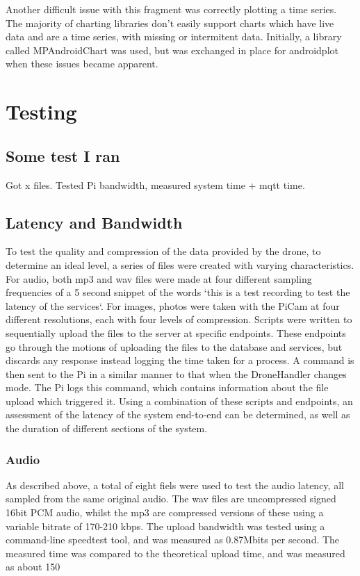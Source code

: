 \documentclass{article}
\begin{document}
Another difficult issue with this fragment was correctly plotting a time series. The majority of charting libraries don't easily support charts which have live data and are a time series, with missing or intermitent data. Initially, a library called MPAndroidChart was used, but was exchanged in place for androidplot when these issues became apparent.   

\section{Testing} \label{Testing}

\subsection{Some test I ran}
Got  x files. Tested Pi bandwidth, measured system time + mqtt time. 

\subsection{Latency and Bandwidth}

To test the quality and compression of the data provided by the drone, to determine an ideal level, a series of files were created with varying characteristics. For audio, both mp3 and wav files were made at four different sampling frequencies of a 5 second snippet of the words `this is a test recording to test the latency of the services`. For images, photos were taken with the PiCam at four different resolutions, each with four levels of compression. Scripts were written to sequentially upload the files to the server at specific endpoints. These endpoints go through the motions of uploading the files to the database and services, but discards any response instead logging the time taken for a process. A command is then sent to the Pi in a similar manner to that when the DroneHandler changes mode. The Pi logs this command, which contains information about the file upload which triggered it. Using a combination of these scripts and endpoints, an assessment of the latency of the system end-to-end can be determined, as well as the duration of different sections of the system. 

\subsubsection{Audio}
As described above, a total of eight fiels were used to test the audio latency, all sampled from the same original audio. The wav files are uncompressed signed 16bit PCM audio, whilst the mp3 are compressed versions of these using a variable bitrate of 170-210 kbps. The upload bandwidth was tested using a command-line speedtest tool, and was measured as 0.87Mbits per second. The measured time was compared to the theoretical upload time, and was measured as about 150%
\end{document}
